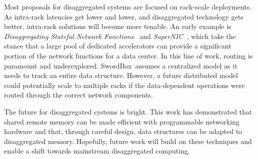 \documentclass[12pt]{ucsddissertation}
\newcommand{\sword}{SwordBox}
\begin{document}
Most proposals for disaggregated systems are focused on rack-scale deployments. As intra-rack
latencies get lower and lower, and disaggregated technology gets better, intra-rack solutions will
become more tenable. An early example is \textit{Disaggregating Stateful Network
Functions}~\cite{dsnf} and \textit{SuperNIC}~\cite{supernic}, which take the stance that a large
pool of dedicated accelerators can provide a significant portion of the network functions for a data
center. In this line of work, routing is paramount and underexplored. \sword\ assumes a centralized
model as it needs to track an entire data structure. However, a future distributed model could
potentially scale to multiple racks if the data-dependent operations were routed through the correct
network components.

The future for disaggregated systems is bright. This work has demonstrated that shared remote memory
can be made efficient with programmable networking hardware and that, through careful design, data
structures can be adapted to disaggregated memory. Hopefully, future work will build on these
techniques and enable a shift towards mainstream disaggregated computing.






\end{document}
